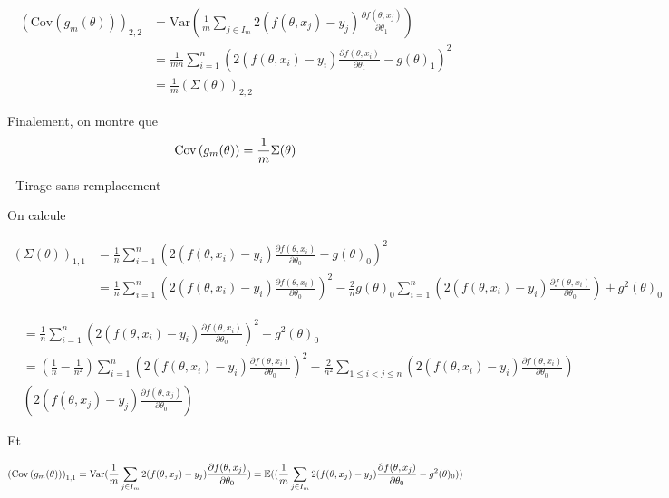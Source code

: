 \documentclass[a4paper,12pt]{article}
\begin{document}
\begin{align*}
	\left(\text{Cov}\left(g_{m}(\theta)\right)\right)_{2, 2} &= \text{Var}\left(\frac{1}{m} \sum_{j \in I_m} 2(f(\theta, x_j) - y_j) \frac{\partial f(\theta, x_j)}{\partial \theta_1}\right) \\
	&= \frac{1}{mn} \sum^{n}_{i = 1} (2(f(\theta, x_i) - y_i) \frac{\partial f(\theta, x_i)}{\partial \theta_1} - g(\theta)_1)^2 \\
	&= \frac{1}{m} \left(\Sigma(\theta)\right)_{2, 2}
\end{align*}


Finalement, on montre que
$$ {\rm Cov} \left( g_{m}(\theta) \right) = \frac{1}{m} \Sigma(\theta) $$


- Tirage sans remplacement

On calcule

\begin{align*}
	\left(\Sigma(\theta)\right)_{1, 1} &= \frac{1}{n} \sum_{i = 1}^{n} (2(f(\theta, x_i) - y_i) \frac{\partial f(\theta, x_i)}{\partial \theta_0} - g(\theta)_0)^2 \\
	&= \frac{1}{n}\sum^{n}_{i = 1} \left(2(f(\theta, x_i) - y_i) \frac{\partial f(\theta, x_i)}{\partial \theta_0}\right)^2 - \frac{2}{n} g(\theta)_0 \sum^{n}_{i = 1} \left(2(f(\theta, x_i) - y_i) \frac{\partial f(\theta, x_i)}{\partial \theta_0}\right) + g^2(\theta)_0
\end{align*}


\begin{align*}
	&= \frac{1}{n} \sum^{n}_{i = 1} \left(2(f(\theta, x_i) - y_i) \frac{\partial f(\theta, x_i)}{\partial \theta_0}\right)^2 - g^2(\theta)_0 \\
	&= \left(\frac{1}{n} - \frac{1}{n^2}\right) \sum^{n}_{i = 1} \left(2(f(\theta, x_i) - y_i) \frac{\partial f(\theta, x_i)}{\partial \theta_0}\right)^2 - \frac{2}{n^2} \sum_{1 \le i \lt j \le n} \left(2(f(\theta, x_i) - y_i) \frac{\partial f(\theta, x_i)}{\partial \theta_0}\right) \\
	&\left(2(f(\theta, x_j) - y_j) \frac{\partial f(\theta, x_j)}{\partial \theta_0}\right)
\end{align*}


Et

$$ \left({\rm Cov} \left( g_{m}(\theta) \right)\right)_{1, 1} = {\rm Var} (\frac{1}{m} \sum_{j \in I_m} 2(f(\theta, x_j) - y_j) \frac{\partial f(\theta, x_j)}{\partial \theta_0}) = \mathbb E((\frac{1}{m} \sum_{j \in I_m} 2(f(\theta, x_j) - y_j) \frac{\partial f(\theta, x_j)}{\partial \theta_0} - g^2(\theta)_0)) $$
\end{document}
